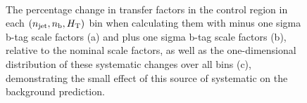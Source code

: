 \begin{figure}[]
  \centering
   ~~
  \newline

  \caption{\label{fig:btagSF-syst-singleMu} The percentage change in
  transfer factors in the \mj control region in each
  $(\njet,\nb,\scalht)$ bin when calculating them with
  minus one sigma b-tag scale factors (a) and plus one sigma
  b-tag scale factors (b), relative to the nominal scale
  factors, as well as the one-dimensional distribution of these
  systematic changes over all bins (c), demonstrating the small effect
  of this source of systematic on the background prediction.}
\end{figure}



